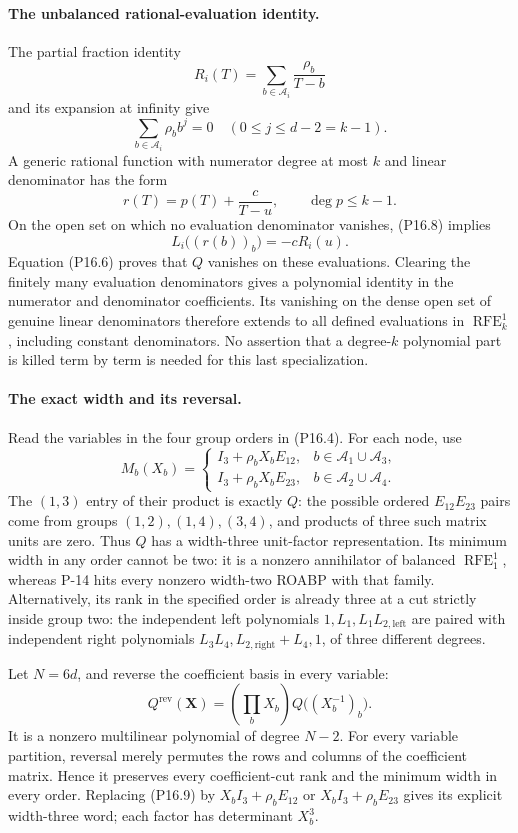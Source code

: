 \paragraph{The unbalanced rational-evaluation identity.}
The partial fraction identity
\[
 R_i(T)=\sum_{b\in\mathcal A_i}\frac{\rho_b}{T-b}
\]
and its expansion at infinity give
\[
 \sum_{b\in\mathcal A_i}\rho_b b^j=0
       \quad(0\le j\le d-2=k-1).
 \tag{P16.8}
\]
A generic rational function with numerator degree at most $k$ and
linear denominator has the form
\[
 r(T)=p(T)+\frac{c}{T-u},\qquad \deg p\le k-1.
\]
On the open set on which no evaluation denominator vanishes,
(P16.8) implies
\[
 L_i\bigl((r(b))_b\bigr)=-cR_i(u).
\]
Equation (P16.6) proves that $Q$ vanishes on these evaluations.
Clearing the finitely many evaluation denominators gives a polynomial
identity in the numerator and denominator coefficients. Its vanishing
on the dense open set of genuine linear denominators therefore extends
to all defined evaluations in $\operatorname{RFE}_{k}^{1}$, including
constant denominators. No assertion that a degree-$k$ polynomial part
is killed term by term is needed for this last specialization.

\paragraph{The exact width and its reversal.}
Read the variables in the four group orders in (P16.4). For each node,
use
\[
 M_b(X_b)=
 \begin{cases}
 I_3+\rho_bX_bE_{12},&b\in\mathcal A_1\cup\mathcal A_3,\\
 I_3+\rho_bX_bE_{23},&b\in\mathcal A_2\cup\mathcal A_4.
 \end{cases}
 \tag{P16.9}
\]
The $(1,3)$ entry of their product is exactly $Q$: the possible
ordered $E_{12}E_{23}$ pairs come from groups $(1,2),(1,4),(3,4)$,
and products of three such matrix units are zero. Thus $Q$ has a
width-three unit-factor representation. Its minimum width in any
order cannot be two: it is a nonzero annihilator of balanced
$\operatorname{RFE}_{1}^{1}$, whereas P-14 hits every nonzero
width-two ROABP with that family. Alternatively, its rank in the
specified order is already three at a cut strictly inside group two:
the independent left polynomials $1,L_1,L_1L_{2,\mathrm{left}}$
are paired with independent right polynomials
$L_3L_4,L_{2,\mathrm{right}}+L_4,1$, of three different degrees.

Let $N=6d$, and reverse the coefficient basis in every variable:
\[
 Q^{\mathrm{rev}}(\mathbf X)=
       \left(\prod_bX_b\right)Q\bigl((X_b^{-1})_b\bigr).
 \tag{P16.10}
\]
It is a nonzero multilinear polynomial of degree $N-2$. For every
variable partition, reversal merely permutes the rows and columns
of the coefficient matrix. Hence it preserves every coefficient-cut
rank and the minimum width in every order. Replacing (P16.9) by
$X_bI_3+\rho_bE_{12}$ or $X_bI_3+\rho_bE_{23}$ gives its explicit
width-three word; each factor has determinant $X_b^3$.

